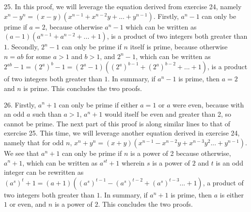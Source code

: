 \documentclass{article}
\begin{document}
25. In this proof, we will leverage the equation derived from exercise 24, namely $x^n - y^n = (x - y)(x^{n-1} + x^{n-2}y + ... + y^{n-1})$. Firstly, $a^n - 1$ can only be prime if $a = 2$, because otherwise $a^n - 1$ which can be written as $(a - 1)(a^{n - 1} + a^{n - 2} + ... + 1)$, is a product of two integers both greater than $1$. Secondly, $2^n - 1$ can only be prime if $n$ itself is prime, because otherwise $n = ab$ for some $a > 1$ and $b > 1$, and $2^n - 1$, which can be written as $2^{ab} - 1 = (2^a)^b - 1 = (2^a - 1)((2^a)^{b - 1} + (2^a)^{b - 2} + ... + 1)$, is a product of two integers both greater than $1$. In summary, if $a^n - 1$ is prime, then $a = 2$ and $n$ is prime. This concludes the two proofs.

26. Firstly, $a^n + 1$ can only be prime if either $a = 1$ or $a$ were even, because with an odd $a$ such than $a > 1$, $a^n + 1$ would itself be even and greater than 2, so cannot be prime. The next part of this proof is along similar lines to that of exercise 25. This time, we will leverage another equation derived in exercise 24, namely that for odd $n$, $x^n + y^n = (x + y)(x^{n-1} - x^{n-2}y + x^{n-3}y^2 ... + y^{n-1})$. We see that $a^n + 1$ can only be prime if $n$ is a power of 2 because otherwise, $a^n + 1$, which can be written as $a^{st} + 1$ wherein $s$ is a power of $2$ and $t$ is an odd integer can be rewritten as $(a^s)^t + 1 = (a + 1)((a^s)^{t-1} - (a^s)^{t - 2} + (a^s)^{t - 3} ... + 1)$, a product of two integers both greater than $1$. In summary, if $a^n + 1$ is prime, then $a$ is either $1$ or even, and $n$ is a power of $2$. This concludes the two proofs.
\end{document}
